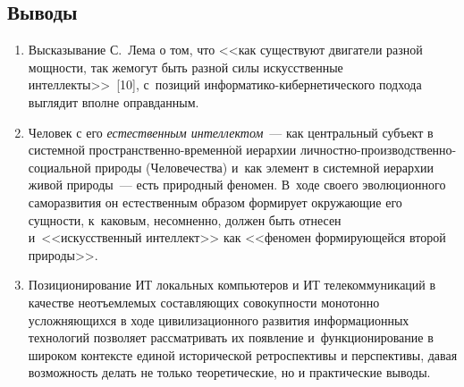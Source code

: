 \begin{multicols}{2}
\section*{Выводы}

\noindent
\begin{enumerate}[1.]
  \item Высказывание С.~Лема о том, что <<как существуют двигатели разной 
мощности, так же\linebreak могут быть разной силы искусственные интеллекты>>~[10], 
с~позиций ин\-фор\-ма\-ти\-ко-ки\-бер\-не\-ти\-че\-ско\-го подхода выглядит вполне 
оправданным.




  \item Человек с его \textit{естественным интеллектом}~--- как центральный 
субъект в системной про\-стран\-ст\-вен\-но-вре\-мен\-н$\acute{\mbox{о}}$й 
иерархии лич\-ност\-но-про\-из\-вод\-ст\-вен\-но-со\-ци\-аль\-ной природы 
(\mbox{Человечества}) и~как элемент в системной иерархии живой природы~--- есть 
природный феномен. В~ходе своего эволюционного саморазвития он 
естественным образом формирует окружающие его сущности, к~каковым, 
несомненно, должен быть отнесен и~<<искусственный интеллект>> как 
<<феномен формирующейся второй природы>>. 
  \item Позиционирование ИТ локальных компьютеров и ИТ 
телекоммуникаций в качестве не\-отъемлемых составляющих совокупности 
монотонно усложняющихся в ходе \mbox{цивилизационного} развития 
информационных технологий позволяет рассматривать их появление 
и~функционирование в широком контексте единой исторической 
ретроспективы и перспективы, давая возможность делать не только 
теоретические, но и практические выводы.
  \end{enumerate}
  
{\small\frenchspacing
{%
\begin{thebibliography}{99}


\end{thebibliography}}}
\end{multicols}
